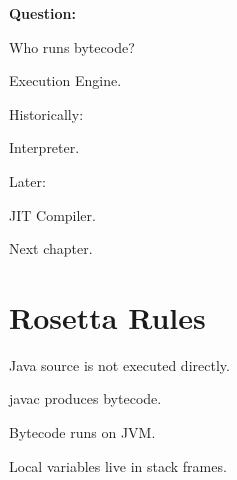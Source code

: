 \documentclass[11pt,a4paper]{book}
\begin{document}
\textbf{Question:}


Who runs bytecode?


Execution Engine.


Historically:


Interpreter.


Later:


JIT Compiler.


Next chapter.


\section{Rosetta Rules}

\begin{rosettarule}

Java source is not executed directly.

\end{rosettarule}


\begin{rosettarule}

javac produces bytecode.

\end{rosettarule}


\begin{rosettarule}

Bytecode runs on JVM.

\end{rosettarule}


\begin{rosettarule}

Local variables live in stack frames.

\end{rosettarule}
\end{document}
